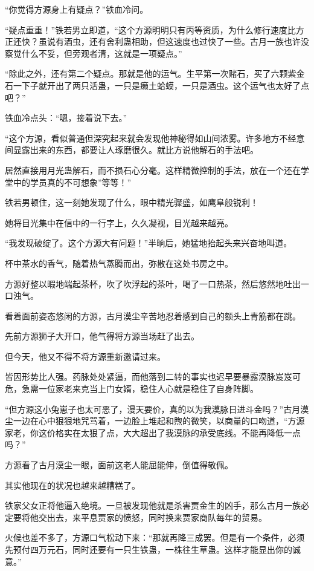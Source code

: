 \begin{this_body}
“你觉得方源身上有疑点？”铁血冷问。

“疑点重重！”铁若男立即道，“这个方源明明只有丙等资质，为什么修行速度比方正还快？虽说有酒虫，还有舍利蛊相助，但这速度也过快了一些。古月一族也许没察觉什么不妥，但旁观者清，这就是一项疑点。”

“除此之外，还有第二个疑点。那就是他的运气。生平第一次赌石，买了六颗紫金石一下子就开出了两只活蛊，一只是癞土蛤蟆，一只是酒虫。这个运气也太好了点吧？”

铁血冷点头：“嗯，接着说下去。”

“这个方源，看似普通但深究起来就会发现他神秘得如山间浓雾。许多地方不经意间显露出来的东西，都要让人琢磨很久。就比方说他解石的手法吧。

居然直接用月光蛊解石，而不损石心分毫。这样精微控制的手法，放在一个还在学堂中的学员真的不可想象”等等！”

铁若男顿住，这一刻她发现了什么，眼中精光骤盛，如鹰阜般锐利！

她将目光集中在信中的一行字上，久久凝视，目光越来越亮。

“我发现破绽了。这个方源大有问题！”半晌后，她猛地抬起头来兴奋地叫道。

杯中茶水的香气，随着热气蒸腾而出，弥散在这处书房之中。

方源好整以暇地端起茶杯，吹了吹浮起的茶叶，喝了一口热茶，然后悠然地吐出一口浊气。

看着面前姿态悠闲的方源，古月漠尘辛苦地忍着感到自己的额头上青筋都在跳。

先前方源狮子大开口，他气得将方源当场赶了出去。

但今天，他又不得不将方源重新邀请过来。

皆因形势比人强。药脉处处紧逼，而他落到二转的事实也迟早要暴露漠脉岌岌可危，急需一位家老来克当上门女婿，稳住人心就是稳住了自身阵脚。

“但方源这小兔崽子也太可恶了，漫天要价，真的以为我漠脉日进斗金吗？”古月漠尘一边在心中狠狠地咒骂着，一边脸上堆起和煦的微笑，以商量的口吻道，“方源家老，你这价格实在太狠了点，大大超出了我漠脉的承受底线。不能再降低一点吗？”

方源看了古月漠尘一眼，面前这老人能屈能伸，倒值得敬佩。

其实他现在的状况也越来越糟糕了。

铁家父女正将他逼入绝境。一旦被发现他就是杀害贾金生的凶手，那么古月一族必定要将他交出去，来平息贾家的愤怒，同时换来贾家商队每年的贸易。

火候也差不多了，方源口气松动下来：“那就再降三成罢。但是有一个条件，必须先预付四万元石，同时还要有一只生铁蛊，一株往生草蛊。这样才能显出你的诚意。”


\end{this_body}
